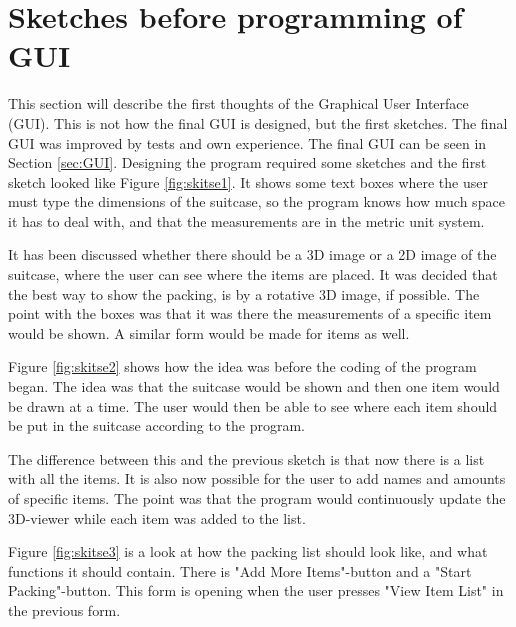 \section{Sketches before programming of GUI}
\label{sec:sketches}
This section will describe the first thoughts of the Graphical User Interface (GUI). This is not how the final GUI is designed, but the first sketches. The final GUI was improved by tests and own experience. The final GUI can be seen in Section \ref{sec:GUI}.
Designing the program required some sketches and the first sketch looked like Figure \ref{fig:skitse1}.
It shows some text boxes where the user must type the dimensions of the suitcase, so the program knows how much space it has to deal with, and that the measurements are in the metric unit system.


It has been discussed whether there should be a 3D image or a 2D image of the suitcase, where the user can see where the items are placed. It was decided that the best way to show the packing, is by a rotative 3D image, if possible.
The point with the boxes was that it was there the measurements of a specific item would be shown.
A similar form would be made for items as well.


Figure \ref{fig:skitse2} shows how the idea was before the coding of the program began. The idea was that the suitcase would be shown and then one item would be drawn at a time. The user would then be able to see where each item should be put in the suitcase according to the program.

The difference between this and the previous sketch is that now there is a list with all the items. It is also now possible for the user to add names and amounts of specific items. The point was that the program would continuously update the 3D-viewer while each item was added to the list.


Figure \ref{fig:skitse3} is a look at how the packing list should look like, and what functions it should contain.
There is "Add More Items"-button and a "Start Packing"-button. This form is opening when the user presses "View Item List" in the previous form.

